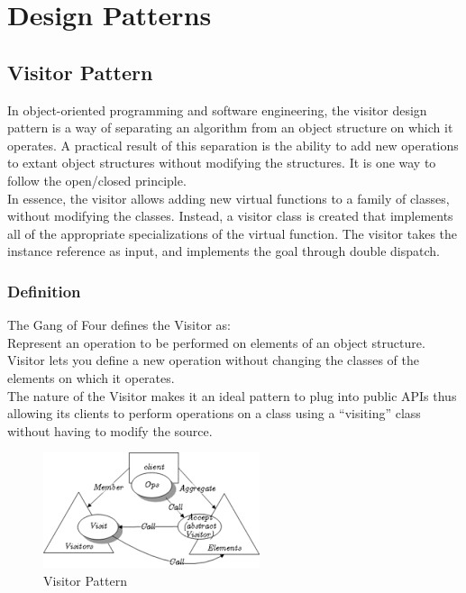 \section{Design Patterns}
\subsection{Visitor Pattern}
In object-oriented programming and software engineering, the visitor design pattern is a way of separating an algorithm from an object structure on which it operates. A practical result of this separation is the ability to add new operations to extant object structures without modifying the structures. It is one way to follow the open/closed principle.\\
In essence, the visitor allows adding new virtual functions to a family of classes, without modifying the classes. Instead, a visitor class is created that implements all of the appropriate specializations of the virtual function. The visitor takes the instance reference as input, and implements the goal through double dispatch.
\subsubsection{Definition}
The Gang of Four defines the Visitor as:\\
Represent an operation to be performed on elements of an object structure. Visitor lets you define a new operation without changing the classes of the elements on which it operates.\\
The nature of the Visitor makes it an ideal pattern to plug into public APIs thus allowing its clients to perform operations on a class using a “visiting” class without having to modify the source.
\begin{figure}[H]
	\centering
	\includegraphics{images/visitor_pattern.png}
	\caption{Visitor Pattern}
\end{figure}
